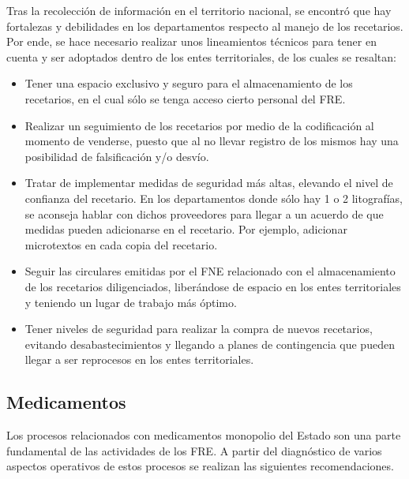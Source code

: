 \documentclass[
]{book}
\begin{document}
Tras la recolección de información en el territorio nacional, se encontró que hay fortalezas y debilidades en los departamentos respecto al manejo de los recetarios. Por ende, se hace necesario realizar unos lineamientos técnicos para tener en cuenta y ser adoptados dentro de los entes territoriales, de los cuales se resaltan:

\begin{itemize}
\item
  Tener una espacio exclusivo y seguro para el almacenamiento de los recetarios, en el cual sólo se tenga acceso cierto personal del FRE.
\item
  Realizar un seguimiento de los recetarios por medio de la codificación al momento de venderse, puesto que al no llevar registro de los mismos hay una posibilidad de falsificación y/o desvío.
\item
  Tratar de implementar medidas de seguridad más altas, elevando el nivel de confianza del recetario. En los departamentos donde sólo hay 1 o 2 litografías, se aconseja hablar con dichos proveedores para llegar a un acuerdo de que medidas pueden adicionarse en el recetario. Por ejemplo, adicionar microtextos en cada copia del recetario.
\item
  Seguir las circulares emitidas por el FNE relacionado con el almacenamiento de los recetarios diligenciados, liberándose de espacio en los entes territoriales y teniendo un lugar de trabajo más óptimo.
\item
  Tener niveles de seguridad para realizar la compra de nuevos recetarios, evitando desabastecimientos y llegando a planes de contingencia que pueden llegar a ser reprocesos en los entes territoriales.
\end{itemize}

\hypertarget{medicamentos}{%
\subsection{Medicamentos}\label{medicamentos}}

Los procesos relacionados con medicamentos monopolio del Estado son una parte fundamental de las actividades de los FRE. A partir del diagnóstico de varios aspectos operativos de estos procesos se realizan las siguientes recomendaciones.
\end{document}
